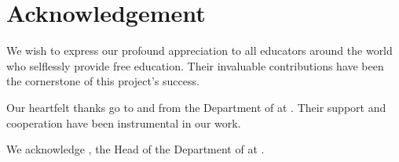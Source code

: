 \chapter*{Acknowledgement}%
%



\par We wish to express our profound appreciation to all educators around the world who selflessly provide free education. Their invaluable contributions have been the cornerstone of this project's success.

Our heartfelt thanks go to \projcordinatorA\hspace*{2pt} and \projcordinatorB\hspace*{2pt} from the Department of \dept\hspace*{2pt} at \college\hspace*{2pt}. Their support and cooperation have been instrumental in our work.

We acknowledge \hod, the Head of the Department of \dept\hspace*{2pt} at \college\hspace*{2pt}.

\vspace*{30pt}
\begin{flushright}
	\textbf{\studentA}\\
	\textbf{\studentB}\\
	\textbf{\studentC}\\
	\textbf{\studentD}\\
\end{flushright}
\thispagestyle{plain}

